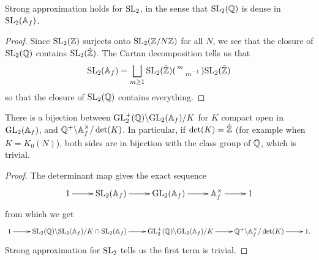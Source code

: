 \begin{thm}
    Strong approximation holds for $\mathrm{SL}_2$, in the sense that $\mathrm{SL}_2(\mathbb{Q})$ is dense in $\mathrm{SL}_2(\mathbb{A}_f)$.
\end{thm}
\begin{proof}
    Since $\mathrm{SL}_2(\mathbb{Z})$ surjects onto $\mathrm{SL}_2(\mathbb{Z}/N\mathbb{Z})$ for all $N$, we see that the closure of $\mathrm{SL}_2(\mathbb{Q})$ contains $\mathrm{SL}_2(\hat{\mathbb{Z}})$. The Cartan decomposition tells us that
    $$\mathrm{SL}_2(\mathbb{A}_f) = \bigsqcup\limits_{m\geq 1} \mathrm{SL}_2(\hat{\mathbb{Z}})\begin{psmallmatrix}
        m& \\ & m^{-1}
    \end{psmallmatrix} \mathrm{SL}_2(\hat{\mathbb{Z}})$$ so that the closure of $\mathrm{SL}_2(\mathbb{Q})$ contains everything.
\end{proof}


\begin{prop}
    There is a bijection between $\mathrm{GL}_2^+(\mathbb{Q})\backslash\mathrm{GL}_2(\mathbb{A}_f)/K$ for $K$ compact open in $\mathrm{GL}_2(\mathbb{A}_f)$, and $\mathbb{Q}^+ \backslash \mathbb{A}_f^\times/\det(K)$. In particular, if $\det(K) = \hat{\mathbb{Z}}$ (for example when $K=K_0(N)$), both sides are in bijection with the class group of $\mathbb{Q}$, which is trivial.
\end{prop}
\begin{proof}
The determinant map gives the exact sequence
$$\xymatrix{1 \ar[r] & \SL_2(\adele_f) \ar[r] & \GL_2(\adele_f) \ar[r] & \adele_f^\times \ar[r] & 1}$$ from which we get
$$\xymatrix{1 \ar[r] & \SL_2(\QQ)\backslash\SL_2(\adele_f)/K \cap \SL_2(\adele_f) \ar[r] & \GL_2^+(\QQ)\backslash\GL_2(\adele_f)/K \ar[r] & \QQ^+ \backslash \adele_f^\times/\det(K) \ar[r] & 1.}$$
Strong approximation for $\mathrm{SL}_2$ tells us the first term is trivial.
\end{proof}

